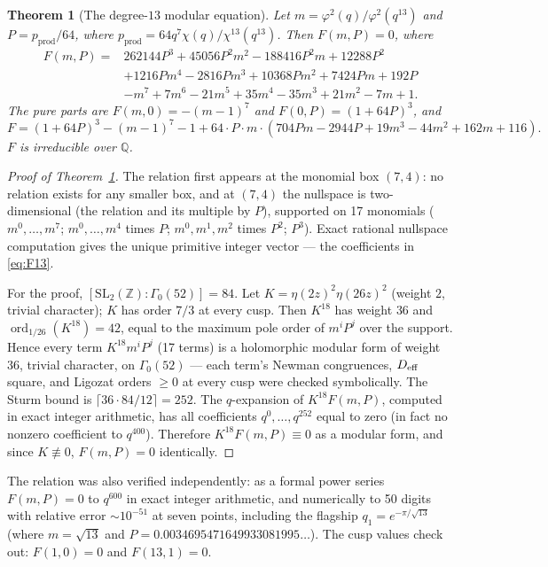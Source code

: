 \documentclass[11pt]{amsart}
\theoremstyle{plain}
\newtheorem{theorem}{Theorem}[section]
\theoremstyle{definition}
\theoremstyle{remark}
\newcommand{\Z}{\mathbb{Z}}
\newcommand{\Q}{\mathbb{Q}}
\newcommand{\pprod}{p_{\mathrm{prod}}}
\begin{document}
\begin{theorem}[The degree-$13$ modular equation]
\label{thm:p13}
Let $m = \varphi^2(q)/\varphi^2(q^{13})$ and $P = \pprod/64$, where
$\pprod = 64q^7\chi(q)/\chi^{13}(q^{13})$. Then $F(m,P) = 0$, where
\begin{align}
F(m,P) ={}& 262144P^3 + 45056P^2m^2 - 188416P^2m + 12288P^2 \nonumber \\
&+ 1216Pm^4 - 2816Pm^3 + 10368Pm^2 + 7424Pm + 192P \nonumber \\
&- m^7 + 7m^6 - 21m^5 + 35m^4 - 35m^3 + 21m^2 - 7m + 1.
\label{eq:F13}
\end{align}
The pure parts are $F(m,0) = -(m-1)^7$ and $F(0,P) = (1+64P)^3$, and
\begin{equation}
F = (1+64P)^3 - (m-1)^7 - 1
+ 64\cdot P\cdot m\cdot(704Pm - 2944P + 19m^3 - 44m^2 + 162m + 116).
\label{eq:F13struct}
\end{equation}
$F$ is irreducible over $\Q$.
\end{theorem}

\begin{proof}[Proof of Theorem~\ref{thm:p13}]
The relation first appears at the monomial box $(7,4)$: no relation exists
for any smaller box, and at $(7,4)$ the nullspace is two-dimensional (the
relation and its multiple by $P$), supported on 17 monomials
($m^0,\dots,m^7$; $m^0,\dots,m^4$ times $P$; $m^0,m^1,m^2$ times $P^2$;
$P^3$). Exact rational nullspace computation gives the unique primitive
integer vector --- the coefficients in \eqref{eq:F13}.

For the proof, $[\mathrm{SL}_2(\Z):\Gamma_0(52)] = 84$. Let
$K = \eta(2z)^2\eta(26z)^2$ (weight $2$, trivial character); $K$ has order
$7/3$ at every cusp. Then $K^{18}$ has weight $36$ and
$\operatorname{ord}_{1/26}(K^{18}) = 42$, equal to the maximum pole order of
$m^iP^j$ over the support. Hence every term $K^{18}m^iP^j$ (17 terms) is a
holomorphic modular form of weight $36$, trivial character, on $\Gamma_0(52)$
--- each term's Newman congruences, $D_{\rm eff}$ square, and Ligozat orders
$\geq 0$ at every cusp were checked symbolically. The Sturm bound is
$\lceil 36\cdot 84/12\rceil = 252$. The $q$-expansion of $K^{18}F(m,P)$,
computed in exact integer arithmetic, has all coefficients $q^0,\dots,q^{252}$
equal to zero (in fact no nonzero coefficient to $q^{400}$). Therefore
$K^{18}F(m,P) \equiv 0$ as a modular form, and since $K \not\equiv 0$,
$F(m,P) = 0$ identically.
\end{proof}

The relation was also verified independently: as a formal power series
$F(m,P) = 0$ to $q^{600}$ in exact integer arithmetic, and numerically to 50
digits with relative error $\sim 10^{-51}$ at seven points, including the
flagship $q_1 = e^{-\pi/\sqrt{13}}$ (where $m = \sqrt{13}$ and
$P = 0.0034695471649933081995\dots$). The cusp values check out:
$F(1,0) = 0$ and $F(13,1) = 0$.
\end{document}

